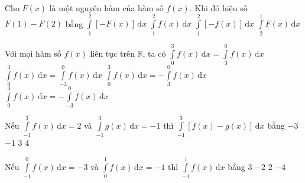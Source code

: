 \begin{ex}%
	Cho $F(x)$ là một nguyên hàm của hàm số $f(x)$. Khi đó hiệu số $F(1) - F(2)$ bằng
	\choice
	{$\displaystyle\int\limits_1^2 [-F(x)]\mathrm{\,d}x$}
	{$\displaystyle\int\limits_1^2 f(x)\mathrm{\,d}x$}
	{\True $\displaystyle\int\limits_1^2 [-f(x)]\mathrm{\,d}x$}
	{$\displaystyle\int\limits_2^1 F(x)\mathrm{\,d}x$}
\end{ex}
\begin{ex}%
	Với mọi hàm số $f(x)$ liên tục trên $\mathbb{R}$, ta có
	\choice
	{$\displaystyle\int\limits_0^3{f(x)\mathrm{\,d}x}=\int\limits_3^0{f(x)\mathrm{\,d}x}$}
	{$\displaystyle\int\limits_0^3{f(x)\mathrm{\,d}x}=\int\limits_{-3}^0{f(x)\mathrm{\,d}x}$}
	{$\displaystyle\int\limits_0^3{f(x)\mathrm{\,d}x}=-\int\limits_3^0{f(x)\mathrm{\,d}x}$}
	{\True $\displaystyle\int\limits_0^3{f(x)\mathrm{\,d}x}=-\int\limits_{-3}^0{f(x)\mathrm{\,d}x}$}
\end{ex}
\begin{ex}%
	Nếu $\displaystyle\int\limits_{-1}^3 f(x)\mathrm{\,d}x = 2$ và $\displaystyle\int\limits_{-1}^3 g(x)\mathrm{\,d}x = -1$ thì $\displaystyle\int\limits_{-1}^3 [ f(x) - g(x)]\mathrm{\,d}x$ bằng
	\choice
	{$-3$}
	{$-1$}
	{\True $3$}
	{$4$}
\end{ex}
\begin{ex}%
	Nếu $\displaystyle\int\limits_{-1}^0 f(x) \mathrm{\,d}x = -3$ và $\displaystyle\int\limits_0^1 f(x)\mathrm{\,d}x = -1$ thì $\displaystyle\int\limits_{-1}^1 f(x)\mathrm{\,d}x$ bằng
	\choice
	{$3$}
	{$-2$}
	{$2$}
	{\True $-4$}
\end{ex}
